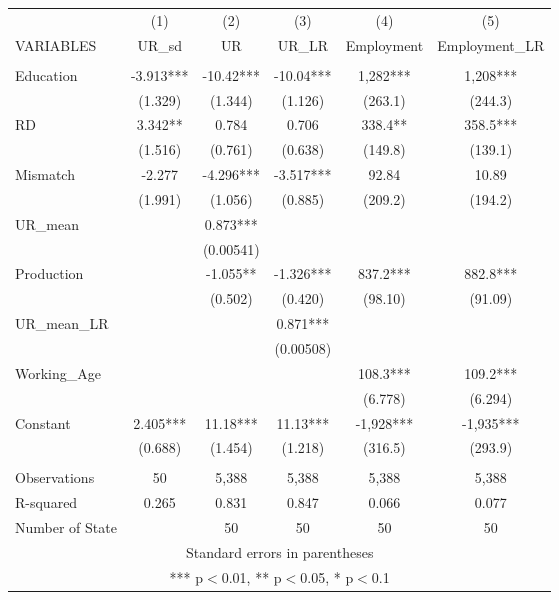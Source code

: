 \documentclass[]{article}
\begin{document}
\begin{tabular}{lccccc} \hline
 & (1) & (2) & (3) & (4) & (5) \\
VARIABLES & UR\_sd & UR & UR\_LR & Employment & Employment\_LR \\ \hline
 &  &  &  &  &  \\
Education & -3.913*** & -10.42*** & -10.04*** & 1,282*** & 1,208*** \\
 & (1.329) & (1.344) & (1.126) & (263.1) & (244.3) \\
RD & 3.342** & 0.784 & 0.706 & 338.4** & 358.5*** \\
 & (1.516) & (0.761) & (0.638) & (149.8) & (139.1) \\
Mismatch & -2.277 & -4.296*** & -3.517*** & 92.84 & 10.89 \\
 & (1.991) & (1.056) & (0.885) & (209.2) & (194.2) \\
UR\_mean &  & 0.873*** &  &  &  \\
 &  & (0.00541) &  &  &  \\
Production &  & -1.055** & -1.326*** & 837.2*** & 882.8*** \\
 &  & (0.502) & (0.420) & (98.10) & (91.09) \\
UR\_mean\_LR &  &  & 0.871*** &  &  \\
 &  &  & (0.00508) &  &  \\
Working\_Age &  &  &  & 108.3*** & 109.2*** \\
 &  &  &  & (6.778) & (6.294) \\
Constant & 2.405*** & 11.18*** & 11.13*** & -1,928*** & -1,935*** \\
 & (0.688) & (1.454) & (1.218) & (316.5) & (293.9) \\
 &  &  &  &  &  \\
Observations & 50 & 5,388 & 5,388 & 5,388 & 5,388 \\
R-squared & 0.265 & 0.831 & 0.847 & 0.066 & 0.077 \\
 Number of State &  & 50 & 50 & 50 & 50 \\ \hline
\multicolumn{6}{c}{ Standard errors in parentheses} \\
\multicolumn{6}{c}{ *** p$<$0.01, ** p$<$0.05, * p$<$0.1} \\
\end{tabular}
\end{document}
